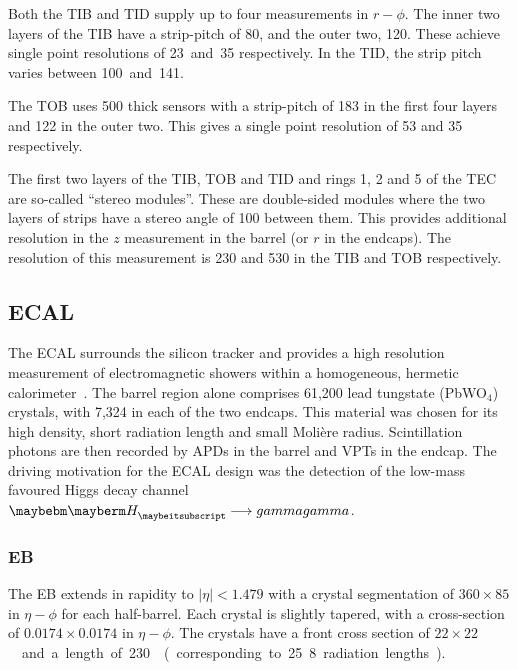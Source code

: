 Both the \ac{TIB} and \ac{TID} supply up to four measurements in $r-\phi$. The
inner two layers of the \ac{TIB} have a strip-pitch of \unit{80}{\micro\metre},
and the outer two, \unit{120}{\micro\metre}. These achieve single point
resolutions of \unit{23 and 35}{\micro\metre} respectively. In the \ac{TID}, the
strip pitch varies between \unit{100 and 141}{\micro\metre}.

The \ac{TOB} uses \unit{500}{\micro\metre} thick sensors with a strip-pitch of
\unit{183}{\micro\metre} in the first four layers and \unit{122}{\micro\metre} in
the outer two. This gives a single point resolution of \unit{53}{\micro\metre}
and \unit{35}{\micro\metre} respectively.

The first two layers of the \ac{TIB}, \ac{TOB} and \ac{TID} and rings 1, 2 and 5
of the \ac{TEC} are so-called ``stereo modules''. These are double-sided modules
where the two layers of strips have a stereo angle of \unit{100}{\milli\radian}
between them. This provides additional resolution in the $z$ measurement in the
barrel (or $r$ in the endcaps). The resolution of this measurement is
\unit{230}{\micro\metre} and \unit{530}{\micro\metre} in the \ac{TIB} and
\ac{TOB} respectively.

\subsection{\acl{ECAL}}
The \ac{ECAL} surrounds the silicon tracker and provides a high resolution
measurement of electromagnetic showers within a homogeneous, hermetic
calorimeter~\cite{ecal_paper}. The barrel region alone comprises 61,200 lead
tungstate (PbWO$_4$) crystals, with 7,324 in each of the two endcaps. This
material was chosen for its high density, short radiation length and small
Moli\`{e}re radius. Scintillation photons are then recorded by \acp{APD} in the
barrel and \acp{VPT} in the endcap. The driving motivation for the \ac{ECAL}
design was the detection of the low-mass favoured Higgs decay channel
$\PH\longrightarrow\gamma\gamma$.

\subsubsection{\acl{EB}}
The \ac{EB} extends in rapidity to $|\eta|<1.479$ with a crystal segmentation
of $360\times 85$ in $\eta-\phi$ for each half-barrel. Each crystal is slightly
tapered, with a cross-section of $0.0174\times0.0174$ in $\eta-\phi$. The
crystals have a front cross section of \unit{$22\times
  22$}{\milli\metre\squared} and a length of \unit{230}{\milli\metre}
(corresponding to 25.8 radiation lengths).

